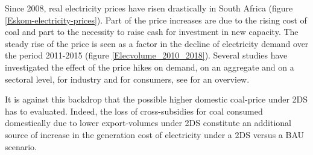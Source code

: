 \documentclass[12pt,english]{article}
\begin{document}
Since 2008, real electricity prices have risen drastically in South Africa (figure \ref{Eskom-electricity-prices}). Part of the price increases are due to the rising cost of coal and part to the necessity to raise cash for investment in new capacity. The steady rise of the price is seen as a factor in the decline of electricity demand over the period 2011-2015 (figure \ref{Elecvolume_2010_2018}). Several studies have investigated the effect of the price hikes on demand, on an aggregate and on a sectoral level, for industry and for consumers, see \cite{goliger2018electricity} for an overview.


It is against this backdrop that the possible higher domestic coal-price under 2DS has to evaluated. Indeed, the loss of cross-subsidies for coal consumed domestically due to lower export-volumes under 2DS constitute an additional source of increase in the generation cost of electricity under a 2DS versus a BAU scenario.



%
%
%
%

%
%
\end{document}
